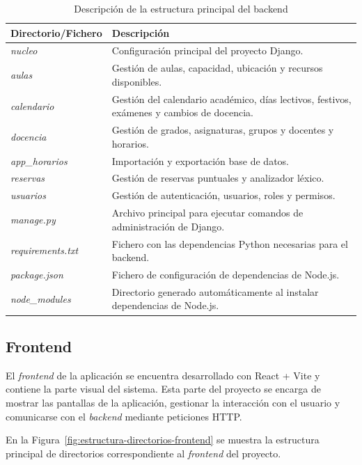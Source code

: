 \begin{table}[H]
	\centering
	\begin{tabular}{l p{9cm}}
		\toprule
		\textbf{Directorio/Fichero} & \textbf{Descripción} \\
		\midrule
		\textit{nucleo} & Configuración principal del proyecto Django. \\
		\textit{aulas} & Gestión de aulas, capacidad, ubicación y recursos disponibles. \\
		\textit{calendario} & Gestión del calendario académico, días lectivos, festivos, exámenes y cambios de docencia. \\
		\textit{docencia} & Gestión de grados, asignaturas, grupos y docentes y horarios. \\
		\textit{app\_horarios} & Importación y exportación base de datos. \\
		\textit{reservas} & Gestión de reservas puntuales y analizador léxico. \\
		\textit{usuarios} & Gestión de autenticación, usuarios, roles y permisos. \\
		\textit{manage.py} & Archivo principal para ejecutar comandos de administración de Django. \\
		\textit{requirements.txt} & Fichero con las dependencias Python necesarias para el backend. \\
		\textit{package.json} & Fichero de configuración de dependencias de Node.js. \\
		\textit{node\_modules} & Directorio generado automáticamente al instalar dependencias de Node.js. \\
		\bottomrule
	\end{tabular}
	\caption{Descripción de la estructura principal del backend}
	\label{tab:estructura-backend}
\end{table}

\subsection{Frontend}

El \textit{frontend} de la aplicación se encuentra desarrollado con React + Vite y contiene la parte visual del sistema. Esta parte del proyecto se encarga de mostrar las pantallas de la aplicación, gestionar la interacción con el usuario y comunicarse con el \textit{backend} mediante peticiones HTTP.

En la Figura~\ref{fig:estructura-directorios-frontend} se muestra la estructura principal de directorios correspondiente al \textit{frontend} del proyecto.

